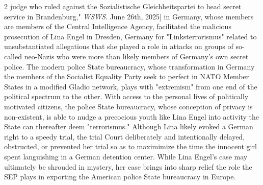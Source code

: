 \documentclass[10pt,a4paper,twoside]{article} %
\begin{document}
\begin{multicols}{2}
{{judge who ruled against the Sozialistische Gleichheitspartei to head secret service in Brandenburg," \emph{WSWS}. June 26th, 2025]} in Germany, whose members are members of the Central Intelligence Agency, facilitated the malicious prosecution of Lina Engel in Dresden, Germany for "Linksterrorismus" related to unsubstantiated allegations that she played a role in attacks on groups of so-called neo-Nazis who were more than likely members of Germany's own secret police. The modern police State bureaucracy, whose transformation in Germany the members of the Socialist Equality Party seek to perfect in NATO Member States in a modified Gladio network, plays with "extremism" from one end of the political spectrum to the other. With access to the personal lives of politically motivated citizens, the police State bureaucracy, whose conception of privacy is non-existent, is able to nudge a precocious youth like Lina Engel into activity the State can thereafter deem "terrorismus." Although Lina likely evoked a German right to a speedy trial, the trial Court deliberately and intentionally delayed, obstructed, or prevented her trial so as to maximimize the time the innocent girl spent languishing in a German detention center. While Lina Engel's case may ultimately be shrouded in mystery, her case brings into sharp relief the role the SEP plays in exporting the American police State bureaucracy in Europe.}


\end{multicols}
\end{document}
